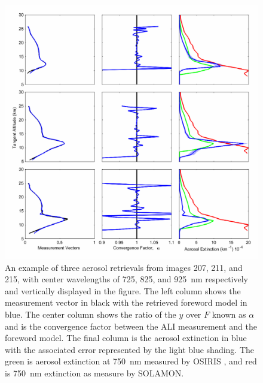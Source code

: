 \documentclass[12pt]{article}
\begin{document}
\begin{figure}
\includegraphics[width=1.0\textwidth]{./Images/AliRetreivals.pdf}
    \caption{An example of three aerosol retrievals from images 207, 211, and 215, with center wavelengths of 725, 825, and 925~nm respectively and vertically displayed in the figure. The left column shows the measurement vector in black with the retrieved foreword model in blue. The center column shows the ratio of the $y$ over $F$ known as $\alpha$ and is the convergence factor between the ALI measurement and the foreword model. The final column is the aerosol extinction in blue with the associated error represented by the light blue shading. The green is aerosol extinction at 750~nm measured by OSIRIS , and red is 750~nm extinction as measure by SOLAMON.}
    \label{fig:AliRetreivals}
\end{figure}
\end{document}
